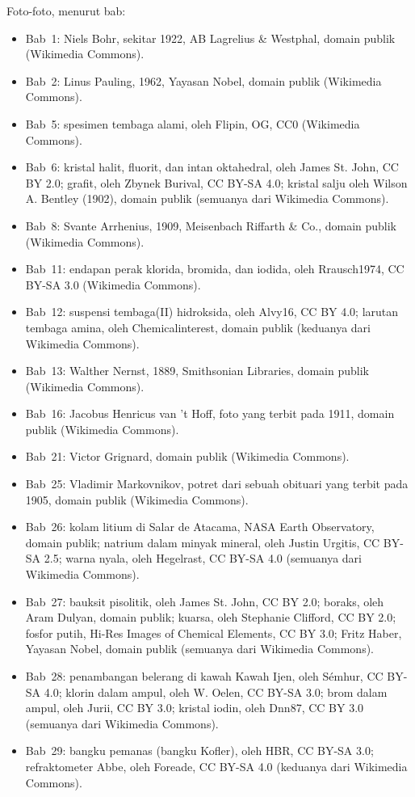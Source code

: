 \bigskip
\noindent Foto-foto, menurut bab:
\begin{itemize}\small
  \item Bab~1: Niels Bohr, sekitar 1922, AB Lagrelius \& Westphal, domain
        publik (Wikimedia Commons).
  \item Bab~2: Linus Pauling, 1962, Yayasan Nobel, domain publik
        (Wikimedia Commons).
  \item Bab~5: spesimen tembaga alami, oleh Flipin, OG, CC0 (Wikimedia
        Commons).
  \item Bab~6: kristal halit, fluorit, dan intan oktahedral, oleh James
        St. John, CC BY 2.0; grafit, oleh Zbynek Burival, CC BY-SA 4.0;
        kristal salju oleh Wilson A. Bentley (1902), domain publik
        (semuanya dari Wikimedia Commons).
  \item Bab~8: Svante Arrhenius, 1909, Meisenbach Riffarth \& Co., domain
        publik (Wikimedia Commons).
  \item Bab~11: endapan perak klorida, bromida, dan iodida, oleh
        Rrausch1974, CC BY-SA 3.0 (Wikimedia Commons).
  \item Bab~12: suspensi tembaga(II) hidroksida, oleh Alvy16, CC BY 4.0;
        larutan tembaga amina, oleh Chemicalinterest, domain publik
        (keduanya dari Wikimedia Commons).
  \item Bab~13: Walther Nernst, 1889, Smithsonian Libraries, domain publik
        (Wikimedia Commons).
  \item Bab~16: Jacobus Henricus van 't Hoff, foto yang terbit pada 1911,
        domain publik (Wikimedia Commons).
  \item Bab~21: Victor Grignard, domain publik (Wikimedia Commons).
  \item Bab~25: Vladimir Markovnikov, potret dari sebuah obituari yang
        terbit pada 1905, domain publik (Wikimedia Commons).
  \item Bab~26: kolam litium di Salar de Atacama, NASA Earth Observatory,
        domain publik; natrium dalam minyak mineral, oleh Justin Urgitis,
        CC BY-SA 2.5; warna nyala, oleh Hegelrast, CC BY-SA 4.0 (semuanya
        dari Wikimedia Commons).
  \item Bab~27: bauksit pisolitik, oleh James St. John, CC BY 2.0; boraks,
        oleh Aram Dulyan, domain publik; kuarsa, oleh Stephanie Clifford,
        CC BY 2.0; fosfor putih, Hi-Res Images of Chemical Elements,
        CC BY 3.0; Fritz Haber, Yayasan Nobel, domain publik (semuanya dari
        Wikimedia Commons).
  \item Bab~28: penambangan belerang di kawah Kawah Ijen, oleh S\'emhur,
        CC BY-SA 4.0; klorin dalam ampul, oleh W. Oelen, CC BY-SA 3.0; brom
        dalam ampul, oleh Jurii, CC BY 3.0; kristal iodin, oleh Dnn87,
        CC BY 3.0 (semuanya dari Wikimedia Commons).
  \item Bab~29: bangku pemanas (bangku Kofler), oleh HBR, CC BY-SA 3.0;
        refraktometer Abbe, oleh Foreade, CC BY-SA 4.0 (keduanya dari
        Wikimedia Commons).
\end{itemize}
\clearpage

